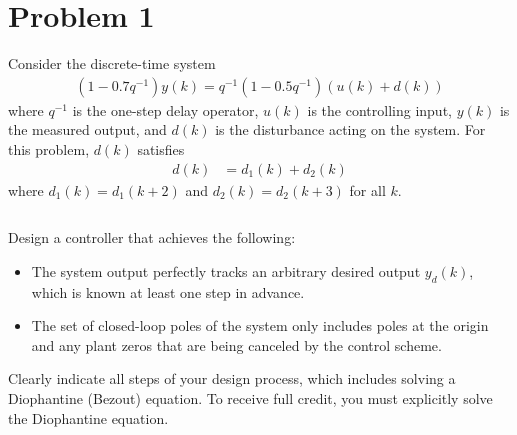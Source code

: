 \section*{Problem 1}

Consider the discrete-time system
\begin{align*}
    (1 - 0.7 q^{-1}) y(k) = q^{-1} (1 - 0.5q^{-1}) (u(k) + d(k))
\end{align*}
where $q^{-1}$ is the one-step delay operator, $u(k)$ is the controlling input, $y(k)$ is the measured
output, and $d(k)$ is the disturbance acting on the system. For this problem, $d(k)$ satisfies
\begin{align*}
    d(k) & = d_1(k) + d_2(k)
\end{align*}
where $d_1(k) = d_1(k+2)$ and $d_2(k) = d_2(k+3)$ for all $k$.

$\,$

\noindent Design a controller that achieves the following:
\begin{itemize}
    \item
    The system output perfectly tracks an arbitrary desired output $y_d(k)$, which is known at least one step in advance.

    \item
    The set of closed-loop poles of the system only includes poles at the origin and any plant zeros that are being canceled by the control scheme.
    
\end{itemize}
Clearly indicate all steps of your design process, which includes solving a Diophantine (Bezout) equation. To receive full credit, you must explicitly solve the Diophantine equation.
